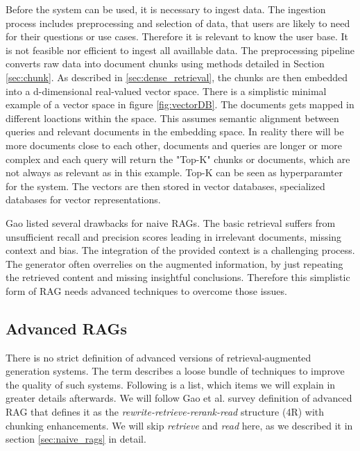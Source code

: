 Before the system can be used, it is necessary to ingest data. The ingestion process includes preprocessing and selection of data, that users are likely to need for their questions or use cases. Therefore it is relevant to know the user base. It is not feasible nor efficient to ingest all availlable data. The preprocessing pipeline converts raw data into document chunks using methods detailed in Section \ref{sec:chunk}. As described in \ref{sec:dense_retrieval}, the chunks are then embedded into a d-dimensional real-valued vector space. There is a simplistic minimal example of a vector space in figure \ref{fig:vectorDB}. The documents gets mapped in different loactions within the space. This assumes semantic alignment between queries and relevant documents in the embedding space. In reality there will be more documents close to each other, documents and queries are longer or more complex and each query will return the "Top-K" chunks or documents, which are not always as relevant as in this example. Top-K can be seen as hyperparamter for the system. The vectors are then stored in vector databases, specialized databases for vector representations.


Gao \cite{Gao.18.12.2023} listed several drawbacks for naive RAGs. The basic retrieval suffers from unsufficient recall and precision scores leading in irrelevant documents, missing context and bias. The integration of the provided context is a challenging process. The generator often overrelies on the augmented information, by just repeating the retrieved content and missing insightful conclusions. Therefore this simplistic form of RAG needs advanced techniques to overcome those issues. 

\subsection{Advanced RAGs}
\label{sec:advanced_rags}

There is no strict definition of advanced versions of retrieval-augmented generation systems. The term describes a loose bundle of techniques to improve the quality of such systems. Following is a list, which items we will explain in greater details afterwards. We will follow Gao et al. survey definition of advanced RAG that defines it as the \textit{rewrite-retrieve-rerank-read} structure (4R) with chunking enhancements. We will skip \textit{retrieve} and \textit{read} here, as we described it in section \ref{sec:naive_rags} in detail.

